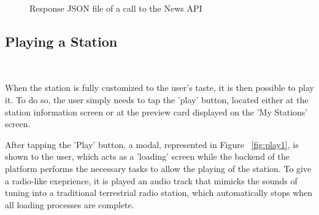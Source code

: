 \begin{figure}[h]
\centering
{}
\caption{Response JSON file of a call to the News API}
\label{fig:mys}
\end{figure}

\newpage
\subsection{Playing a Station}
~\label{subs:playing}

When the station is fully customized to the user's taste, it is then possible to play it. To do so, the user simply needs to tap the 'play' button, located either at the station information screen or at the preview card displayed on the 'My Stations' screen. 

After tapping the 'Play' button, a modal, represented in Figure ~\ref{fig:play1}, is shown to the user, which acts as a 'loading' screen while the backend of the platform performs the necessary tasks to allow the playing of the station. To give a radio-like exeprience, it is played an audio track that mimicks the sounds of tuning into a traditional terrestrial radio station, which automatically stops when all loading processes are complete. 

